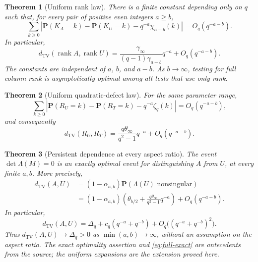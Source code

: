 \documentclass[11pt,letterpaper]{article}
\newtheorem{theorem}{Theorem}[section]
\theoremstyle{remark}
\newcommand{\Prob}{\mathbf P}
\newcommand{\TV}{d_{\mathrm{TV}}}
\newcommand{\rank}{\operatorname{rank}}
\begin{document}
\begin{theorem}[Uniform rank law]\label{thm:rank}
There is a finite constant depending only on $q$ such that, for every pair
of positive even integers $a\ge b$,
\begin{equation}\label{eq:rank-l1}
 \sum_{k\ge0}\left|
 \Prob(K_A=k)-\Prob(K_U=k)-q^{-a}\chi_{a-b}(k)
 \right|=O_q(q^{-a-b}).
\end{equation}
In particular,
\begin{equation}\label{eq:rank-tv}
 \boxed{\displaystyle
 \TV(\rank A,\rank U)
 =\frac{\gamma_\infty}{(q-1)\gamma_{a-b}}q^{-a}
       +O_q(q^{-a-b}).}
\end{equation}
The constants are independent of $a$, $b$, and $a-b$.
As $b\to\infty$, testing for full column rank is asymptotically optimal
among all tests that use only rank.
\end{theorem}

\begin{theorem}[Uniform quadratic-defect law]\label{thm:defect}
For the same parameter range,
\begin{equation}\label{eq:defect-l1}
 \sum_{k\ge0}\left|
 \Prob(R_U=k)-\Prob(R_T=k)-q^{-a}\zeta_q(k)
 \right|=O_q(q^{-a-b}),
\end{equation}
and consequently
\begin{equation}\label{eq:defect-tv}
 \TV(R_U,R_T)=\frac{q\theta_\infty}{q^2-1}q^{-a}
               +O_q(q^{-a-b}).
\end{equation}
\end{theorem}

\begin{theorem}[Persistent dependence at every aspect ratio]\label{thm:full}
The event $\det\Lambda(M)=0$ is an exactly optimal event for distinguishing
$A$ from $U$, at every finite $a,b$. More precisely,
\begin{align}
 \TV(A,U)
  &=(1-\alpha_{a,b})\Prob(\Lambda(U)\text{ nonsingular})\label{eq:full-exact}\\
  &=(1-\alpha_{a,b})\left(
    \theta_{b/2}+\frac{q\theta_\infty}{q^2-1}q^{-a}\right)
       +O_q(q^{-a-b}).\label{eq:full-centered}
\end{align}
In particular,
\begin{equation}\label{eq:full-expansion}
 \boxed{\displaystyle
 \TV(A,U)=\Delta_q+c_q(q^{-a}+q^{-b})
                  +O_q\bigl((q^{-a}+q^{-b})^2\bigr).}
\end{equation}
Thus $\TV(A,U)\to\Delta_q>0$ as $\min(a,b)\to\infty$, without an
assumption on the aspect ratio. The exact optimality assertion and
\eqref{eq:full-exact} are antecedents from the source; the uniform
expansions are the extension proved here.
\end{theorem}
\end{document}
